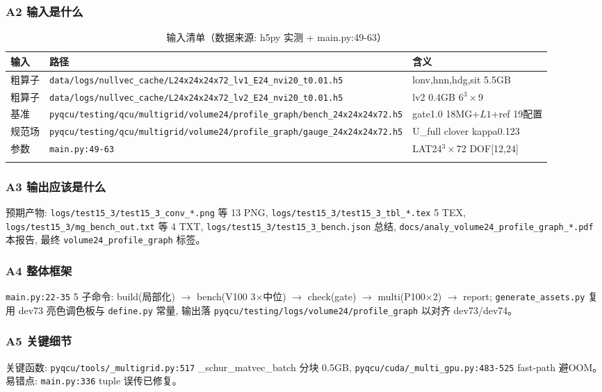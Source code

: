 \documentclass[UTF8]{ctexart}
\begin{document}
\subsubsection{A2 输入是什么}
\begin{xltabular}{\textwidth}{lXl}
\toprule
输入 & 路径 & 含义 \\
\midrule
\endhead
粗算子 & \texttt{\nolinkurl{data/logs/nullvec_cache/L24x24x24x72_lv1_E24_nvi20_t0.01.h5}} & lonv,hnn,hdg,sit 5.5GB \\
粗算子 & \texttt{\nolinkurl{data/logs/nullvec_cache/L24x24x24x72_lv2_E24_nvi20_t0.01.h5}} & lv2 0.4GB 6$^3\times$9 \\
基准 & \texttt{\nolinkurl{pyqcu/testing/qcu/multigrid/volume24/profile_graph/bench_24x24x24x72.h5}} & gate1.0 18MG+$L1$+ref 19配置 \\
规范场 & \texttt{\nolinkurl{pyqcu/testing/qcu/multigrid/volume24/profile_graph/gauge_24x24x24x72.h5}} & U\_full clover kappa0.123 \\
参数 & \texttt{\nolinkurl{main.py:49-63}} & LAT24$^3\times$72 DOF[12,24] \\
\bottomrule
\caption{输入清单（数据来源: h5py 实测 + main.py:49-63）}
\end{xltabular}

\subsubsection{A3 输出应该是什么}
预期产物: \texttt{\nolinkurl{logs/test15_3/test15_3_conv_*.png}} 等 13 PNG, \texttt{\nolinkurl{logs/test15_3/test15_3_tbl_*.tex}} 5 TEX, \texttt{\nolinkurl{logs/test15_3/mg_bench_out.txt}} 等 4 TXT, \texttt{\nolinkurl{logs/test15_3/test15_3_bench.json}} 总结, \texttt{\nolinkurl{docs/analy_volume24_profile_graph_*.pdf}} 本报告, 最终 \texttt{\nolinkurl{volume24_profile_graph}} 标签。

\subsubsection{A4 整体框架}
\texttt{\nolinkurl{main.py:22-35}} 5 子命令: build(局部化) $\to$ bench(V100 3$\times$中位) $\to$ check(gate) $\to$ multi(P100$\times$2) $\to$ report; \texttt{\nolinkurl{generate_assets.py}} 复用 dev73 亮色调色板与 \texttt{\nolinkurl{define.py}} 常量, 输出落 \texttt{\nolinkurl{pyqcu/testing/logs/volume24/profile_graph}} 以对齐 dev73/dev74。

\subsubsection{A5 关键细节}
关键函数: \texttt{\nolinkurl{pyqcu/tools/_multigrid.py:517}} \_schur\_matvec\_batch 分块 0.5GB, \texttt{\nolinkurl{pyqcu/cuda/_multi_gpu.py:483-525}} fast-path 避OOM。易错点: \texttt{\nolinkurl{main.py:336}} tuple 误传已修复。

\end{document}
